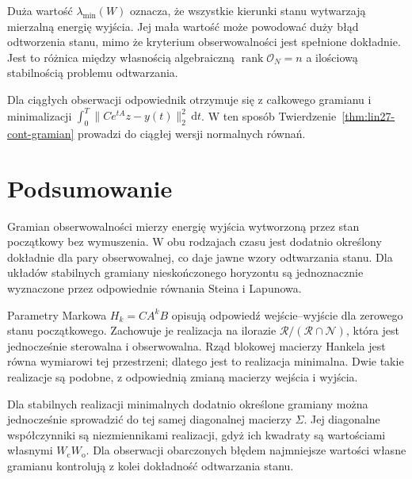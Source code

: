 \begin{uwaga}
\label{rem:lin27-conditioning}
Duża wartość
\(\lambda_{\min}(W)\)
oznacza, że wszystkie
kierunki stanu wytwarzają
mierzalną energię wyjścia.
Jej mała wartość może
powodować duży błąd
odtworzenia stanu,
mimo że kryterium
obserwowalności jest
spełnione dokładnie.
Jest to różnica między
własnością algebraiczną
\(\operatorname{rank}\mathcal O_N=n\)
a ilościową stabilnością
problemu odtwarzania.

Dla ciągłych obserwacji
odpowiednik otrzymuje się
z całkowego gramianu
i minimalizacji
\(\int_0^T
 \|Ce^{tA}z-y(t)\|_2^2\,\mathrm dt\).
W ten sposób
Twierdzenie~\ref{thm:lin27-cont-gramian}
prowadzi do ciągłej
wersji normalnych równań.
\end{uwaga}

\section{Podsumowanie}
\label{sec:lin27-summary}

Gramian obserwowalności
mierzy energię wyjścia
wytworzoną przez stan
początkowy bez wymuszenia.
W obu rodzajach czasu
jest dodatnio określony
dokładnie dla pary
obserwowalnej, co daje
jawne wzory odtwarzania
stanu. Dla układów
stabilnych gramiany
nieskończonego horyzontu
są jednoznacznie wyznaczone
przez odpowiednie
równania Steina i Lapunowa.

Parametry Markowa
\(H_k=CA^kB\)
opisują odpowiedź
wejście--wyjście
dla zerowego stanu
początkowego.
Zachowuje je
realizacja na ilorazie
\(\mathcal R/(\mathcal R\cap\mathcal N)\),
która jest jednocześnie
sterowalna i obserwowalna.
Rząd blokowej macierzy
Hankela jest równa
wymiarowi tej przestrzeni;
dlatego jest to
realizacja minimalna.
Dwie takie realizacje
są podobne,
z odpowiednią zmianą
macierzy wejścia i wyjścia.

Dla stabilnych
realizacji minimalnych
dodatnio określone
gramiany można
jednocześnie sprowadzić
do tej samej diagonalnej
macierzy \(\Sigma\).
Jej diagonalne współczynniki
są niezmiennikami
realizacji, gdyż ich
kwadraty są wartościami
własnymi \(W_{\mathrm c}W_{\mathrm o}\).
Dla obserwacji obarczonych
błędem najmniejsze
wartości własne gramianu
kontrolują z kolei
dokładność odtwarzania
stanu.
